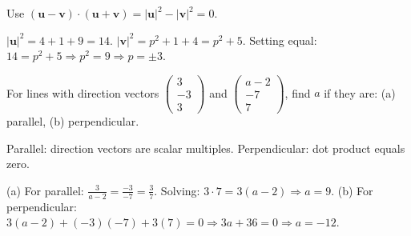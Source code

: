 \begin{hint}
Use $(\mathbf{u} - \mathbf{v}) \cdot (\mathbf{u} + \mathbf{v}) = |\mathbf{u}|^2 - |\mathbf{v}|^2 = 0$.
\end{hint}

\begin{solution}[Sketch]
$|\mathbf{u}|^2 = 4 + 1 + 9 = 14$. $|\mathbf{v}|^2 = p^2 + 1 + 4 = p^2 + 5$. Setting equal: $14 = p^2 + 5 \Rightarrow p^2 = 9 \Rightarrow p = \pm 3$.
\end{solution}

\vspace{1em}

\begin{problem}
For lines with direction vectors $\begin{pmatrix} 3 \\ -3 \\ 3 \end{pmatrix}$ and $\begin{pmatrix} a-2 \\ -7 \\ 7 \end{pmatrix}$, find $a$ if they are: (a) parallel, (b) perpendicular.
\end{problem}

\begin{hint}
Parallel: direction vectors are scalar multiples. Perpendicular: dot product equals zero.
\end{hint}

\begin{solution}[Sketch]
(a) For parallel: $\frac{3}{a-2} = \frac{-3}{-7} = \frac{3}{7}$. Solving: $3 \cdot 7 = 3(a-2) \Rightarrow a = 9$. (b) For perpendicular: $3(a-2) + (-3)(-7) + 3(7) = 0 \Rightarrow 3a + 36 = 0 \Rightarrow a = -12$.
\end{solution}

\vspace{1em}

